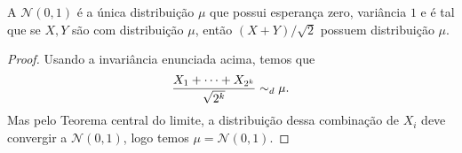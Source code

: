 \begin{corollary}
  A $\mathcal{N}(0,1)$ é a única distribuição $\mu$ que possui esperança zero, variância $1$ e é tal que se $X, Y$ são \iid com distribuição $\mu$, então $(X + Y)/\sqrt{2}$ possuem distribuição $\mu$.
\end{corollary}

\begin{proof}
  Usando a invariância enunciada acima, temos que
  \begin{equation}
    \frac{X_1 + \dots + X_{2^k}}{\sqrt{2^k}} \sim_d \mu.
  \end{equation}
  Mas pelo Teorema central do limite, a distribuição dessa combinação de $X_i$ deve convergir a $\mathcal{N}(0,1)$, logo temos $\mu = \mathcal{N}(0,1)$.
\end{proof}



